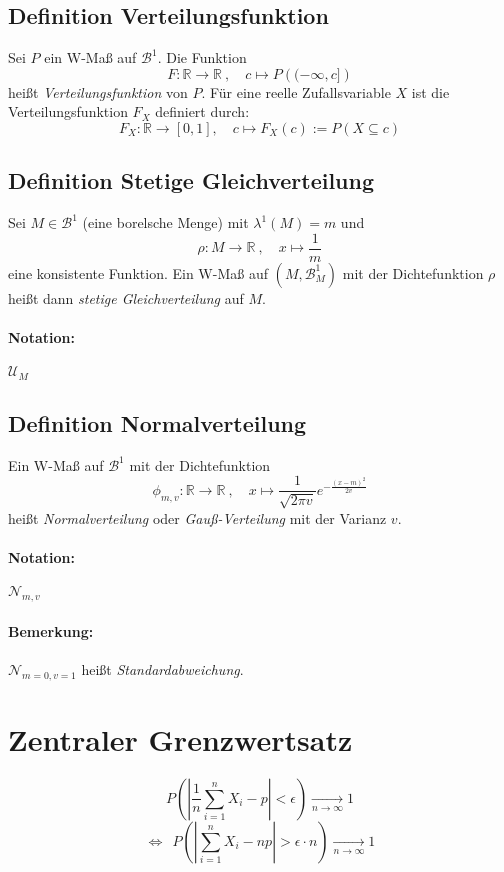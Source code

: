 \documentclass[12pt,a4paper]{article}
\begin{document}
	\subsection{Definition Verteilungsfunktion}
	Sei $P$ ein W-Maß auf $\mathcal{B}^1$. Die Funktion 
	$$F:\mathbb{R}\rightarrow\mathbb{R} \: , \quad c\longmapsto P\left((-\infty,c]\right)$$
	heißt \textit{Verteilungsfunktion} von $P$. Für eine reelle Zufallsvariable $X$ ist die Verteilungsfunktion $F_X$ definiert durch:
	$$F_X:\mathbb{R}\rightarrow[0,1], \quad c\longmapsto F_X(c):=P(X\subseteq c)$$
	
	\subsection{Definition Stetige Gleichverteilung}
	\label{defStetigeGleichverteilung}	
	Sei $M\in\mathcal{B}^1$ (eine borelsche Menge) mit $\lambda^1 (M)=m$ und 
	$$\rho : M\rightarrow\mathbb{R}\: , \quad x\longmapsto \frac{1}{m}$$
	eine konsistente Funktion. Ein W-Maß auf $(M,\mathcal{B}^1_M )$ mit der Dichtefunktion $\rho$ heißt dann \textit{stetige Gleichverteilung} auf $M$.
	\paragraph{Notation:} $\mathcal{U}_M$
	
	\subsection{Definition Normalverteilung}
	\label{defNormalverteilung}
	Ein W-Maß auf $\mathcal{B}^1$ mit der Dichtefunktion
	$$\phi_{m,v} : \mathbb{R}\rightarrow\mathbb{R} \: , \quad x\longmapsto \frac{1}{\sqrt{2\pi v}}e^{-\frac{(x-m)^2}{2v}}$$
	heißt \textit{Normalverteilung} oder \textit{Gauß-Verteilung} mit der Varianz $v$.
	\paragraph{Notation:} $\mathcal{N}_{m,v}$
	\paragraph{Bemerkung:}
	$\mathcal{N}_{m=0,v=1}$ heißt \textit{Standardabweichung}.


	\pagebreak	
	\section{Zentraler Grenzwertsatz}
	$$P\left(\left| \frac{1}{n}\sum_{i=1}^n X_i -p \right| <\epsilon\right) \xrightarrow[n\rightarrow\infty]{}1$$
	$$\Leftrightarrow \:\: P\left( \left| \sum_{i=1}^n X_i -np\right| > \epsilon \cdot n \right) \xrightarrow[n\to\infty]{} 1$$	
\end{document}
